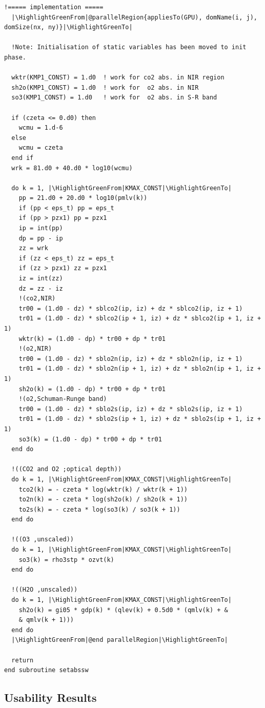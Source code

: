 \begin{lstlisting}[firstnumber=1, name=absswHybrid, label=listing:absswHybrid, caption={Example ASUCA kernel subroutine in Hybrid Fortran}, escapechar=|]
  !===== implementation =====
  |\HighlightGreenFrom|@parallelRegion{appliesTo(GPU), domName(i, j), domSize(nx, ny)}|\HighlightGreenTo|
  
  !Note: Initialisation of static variables has been moved to init phase.

  wktr(KMP1_CONST) = 1.d0  ! work for co2 abs. in NIR region
  sh2o(KMP1_CONST) = 1.d0  ! work for  o2 abs. in NIR
  so3(KMP1_CONST) = 1.d0   ! work for  o2 abs. in S-R band
  
  if (czeta <= 0.d0) then
    wcmu = 1.d-6
  else
    wcmu = czeta
  end if
  wrk = 81.d0 + 40.d0 * log10(wcmu)

  do k = 1, |\HighlightGreenFrom|KMAX_CONST|\HighlightGreenTo|
    pp = 21.d0 + 20.d0 * log10(pmlv(k))
    if (pp < eps_t) pp = eps_t
    if (pp > pzx1) pp = pzx1
    ip = int(pp)
    dp = pp - ip
    zz = wrk
    if (zz < eps_t) zz = eps_t
    if (zz > pzx1) zz = pzx1
    iz = int(zz)
    dz = zz - iz
    !(co2,NIR)
    tr00 = (1.d0 - dz) * sblco2(ip, iz) + dz * sblco2(ip, iz + 1)
    tr01 = (1.d0 - dz) * sblco2(ip + 1, iz) + dz * sblco2(ip + 1, iz + 1)
    wktr(k) = (1.d0 - dp) * tr00 + dp * tr01
    !(o2,NIR)
    tr00 = (1.d0 - dz) * sblo2n(ip, iz) + dz * sblo2n(ip, iz + 1)
    tr01 = (1.d0 - dz) * sblo2n(ip + 1, iz) + dz * sblo2n(ip + 1, iz + 1)
    sh2o(k) = (1.d0 - dp) * tr00 + dp * tr01
    !(o2,Schuman-Runge band)
    tr00 = (1.d0 - dz) * sblo2s(ip, iz) + dz * sblo2s(ip, iz + 1)
    tr01 = (1.d0 - dz) * sblo2s(ip + 1, iz) + dz * sblo2s(ip + 1, iz + 1)
    so3(k) = (1.d0 - dp) * tr00 + dp * tr01
  end do

  !((CO2 and O2 ;optical depth))
  do k = 1, |\HighlightGreenFrom|KMAX_CONST|\HighlightGreenTo|
    tco2(k) = - czeta * log(wktr(k) / wktr(k + 1))
    to2n(k) = - czeta * log(sh2o(k) / sh2o(k + 1))
    to2s(k) = - czeta * log(so3(k) / so3(k + 1))
  end do

  !((O3 ,unscaled))
  do k = 1, |\HighlightGreenFrom|KMAX_CONST|\HighlightGreenTo|
    so3(k) = rho3stp * ozvt(k)
  end do

  !((H2O ,unscaled))
  do k = 1, |\HighlightGreenFrom|KMAX_CONST|\HighlightGreenTo|
    sh2o(k) = gi05 * gdp(k) * (qlev(k) + 0.5d0 * (qmlv(k) + &
    & qmlv(k + 1)))
  end do
  |\HighlightGreenFrom|@end parallelRegion|\HighlightGreenTo|

  return
end subroutine setabssw
\end{lstlisting}

\subsection{Usability Results}

